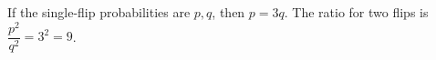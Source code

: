 If the single-flip probabilities are $p,q$, then $p=3q$. The ratio for two flips is $\dfrac{p^2}{q^2}=3^2=\boxed9$.
